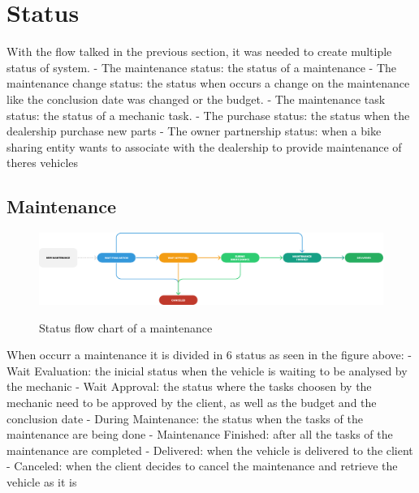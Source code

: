 \section{Status} 

With the flow talked in the previous section, it was needed to create multiple status of system.
- The maintenance status: the status of a maintenance
- The maintenance change status: the status when occurs a change on the maintenance like the conclusion date was changed or the budget.
- The maintenance task status: the status of a mechanic task.
- The purchase status: the status when the dealership purchase new parts
- The owner partnership status: when a bike sharing entity wants to associate with the dealership to provide maintenance of theres vehicles

\subsection{Maintenance} 


\begin{figure}[h]
  \caption{Status flow chart of a maintenance}
  \centering
  \includegraphics[width=\textwidth]{figs/Status/Maintenance/StatusDiagram}
  \label{fig:figure2}
\end{figure}


When occurr a maintenance it is divided in 6 status as seen in the figure above:
- Wait Evaluation: the inicial status when the vehicle is waiting to be analysed by the mechanic
- Wait Approval: the status where the tasks choosen by the mechanic need to be approved by the client, as well as the budget and the conclusion date
- During Maintenance: the status when the tasks of the maintenance are being done
- Maintenance Finished: after all the tasks of the maintenance are completed
- Delivered: when the vehicle is delivered to the client
- Canceled: when the client decides to cancel the maintenance and retrieve the vehicle as it is


